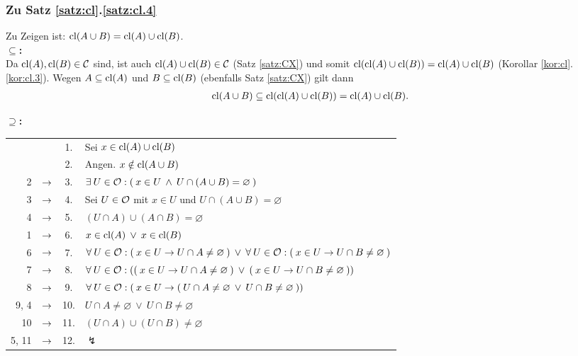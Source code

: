 \subsubsection{Zu Satz \ref{satz:cl}.\ref{satz:cl.4}}
    Zu Zeigen ist: $\text{cl}(A \cup B) = \text{cl}(A) \cup \text{cl}(B)$.\\

    \noindent
    \textbf{\glqq$\boldsymbol{\subseteq}$\grqq:}\\
        Da ${\text{cl}(A),\text{cl}(B) \in \mathcal{C}}$ sind, ist auch ${\text{cl}(A) \cup \text{cl}(B) \in \mathcal{C}}$ (Satz \ref{satz:CX}) und somit ${\text{cl}(\text{cl}(A) \cup \text{cl}(B))= \text{cl}(A) \cup \text{cl}(B)}$ (Korollar \ref{kor:cl}.\ref{kor:cl.3}). Wegen ${A \subseteq \text{cl}(A)}$ und ${B \subseteq \text{cl}(B)}$ (ebenfalls Satz \ref{satz:CX}) gilt dann
        \begin{align*}
            \text{cl}(A \cup B) \subseteq \text{cl}(\text{cl}(A) \cup \text{cl}(B)) = \text{cl}(A) \cup \text{cl}(B).
        \end{align*}

    \noindent
    \textbf{\glqq$\boldsymbol{\supseteq}$\grqq:}

        \begin{longtable}{r c c l}
            & & 1. & Sei $x \in \text{cl}(A) \cup \text{cl}(B)$ \\
            & & 2. & Angen. $x \notin \text{cl}(A \cup B)$ \\
            2 & $\rightarrow$ & 3. & $\exists\: U \in \mathcal{O} : (\: x \in U \:\land\: U \cap (A \cup B) = \varnothing \:)$ \\
            3 & $\rightarrow$ & 4. & Sei $U \in \mathcal{O}$ mit $x \in U$ und $U \cap (A \cup B) = \varnothing$ \\
            4 & $\rightarrow$ & 5. & $(U \cap A) \cup (A \cap B) = \varnothing$ \\
            1 & $\rightarrow$ & 6. & $x \in \text{cl}(A) \:\lor\: x \in \text{cl}(B)$ \\
            6 & $\rightarrow$ & 7. & $\forall\: U \in \mathcal{O} : (\: x \in U \to U \cap A \neq \varnothing \:) \:\lor\: \forall\: U \in \mathcal{O} : (\: x \in U \to U \cap B \neq \varnothing \:)$ \\
            7 & $\rightarrow$ & 8. & $\forall\: U \in \mathcal{O} : ((\: x \in U \to U \cap A \neq \varnothing \:) \:\lor\: (\: x \in U \to U \cap B \neq \varnothing \:))$ \\
            8 & $\rightarrow$ & 9. & $\forall\: U \in \mathcal{O} : (\: x \in U \to (\: U \cap A \neq \varnothing \:\lor\: U \cap B \neq \varnothing \:))$ \\
            9, 4 & $\rightarrow$ & 10. & $U \cap A \neq \varnothing \:\lor\: U \cap B \neq \varnothing$ \\
            10 & $\rightarrow$ & 11. & $(U \cap A) \cup (U \cap B) \neq \varnothing$ \\
            5, 11 & $\rightarrow$ & 12. & $\lightning$ 
        \end{longtable}	
        
